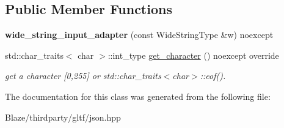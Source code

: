 \subsection*{Public Member Functions}
\begin{DoxyCompactItemize}
\item 
\mbox{\label{classnlohmann_1_1detail_1_1wide__string__input__adapter_a85c8bddae20bc00d64dd7a2c87109357}} 
{\bfseries wide\+\_\+string\+\_\+input\+\_\+adapter} (const Wide\+String\+Type \&w) noexcept
\item 
\mbox{\label{classnlohmann_1_1detail_1_1wide__string__input__adapter_abb62b34cf77e557ce5321b7f2490c3b0}} 
std\+::char\+\_\+traits$<$ char $>$\+::int\+\_\+type \hyperlink{classnlohmann_1_1detail_1_1wide__string__input__adapter_abb62b34cf77e557ce5321b7f2490c3b0}{get\+\_\+character} () noexcept override
\begin{DoxyCompactList}\small\item\em get a character \mbox{[}0,255\mbox{]} or std\+::char\+\_\+traits$<$char$>$\+::eof(). \end{DoxyCompactList}\end{DoxyCompactItemize}


The documentation for this class was generated from the following file\+:\begin{DoxyCompactItemize}
\item 
Blaze/thirdparty/gltf/json.\+hpp\end{DoxyCompactItemize}
